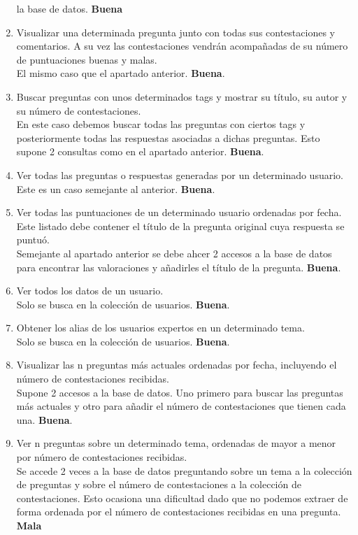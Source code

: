 \documentclass{article}
\begin{document}
\begin{enumerate}
      la base de datos. \textbf{Buena}
      \item Visualizar una determinada pregunta junto con todas sus contestaciones
      y comentarios. A su vez las contestaciones vendrán acompañadas de su
      número de puntuaciones buenas y malas. \\
      El mismo caso que el apartado anterior. \textbf{Buena}.
      \item Buscar preguntas con unos determinados tags y mostrar su título, su autor
      y su número de contestaciones. \\
      En este caso debemos buscar todas las preguntas con ciertos tags y posteriormente
      todas las respuestas asociadas a dichas preguntas. Esto supone 2 consultas como 
      en el apartado anterior. \textbf{Buena}.
      \item Ver todas las preguntas o respuestas generadas por un determinado usuario. \\
      Este es un caso semejante al anterior. \textbf{Buena}.
      \item Ver todas las puntuaciones de un determinado usuario ordenadas por fecha.
      Este listado debe contener el título de la pregunta original cuya respuesta
      se puntuó. \\
      Semejante al apartado anterior se debe ahcer 2 accesos a la base de datos para 
      encontrar las valoraciones y añadirles el título de la pregunta. \textbf{Buena}.
      \item Ver todos los datos de un usuario.\\
      Solo se busca en la colección de usuarios. \textbf{Buena}.
      \item Obtener los alias de los usuarios expertos en un determinado tema.\\
      Solo se busca en la colección de usuarios. \textbf{Buena}.
      \item Visualizar las n preguntas más actuales ordenadas por fecha, incluyendo
      el número de contestaciones recibidas.\\
      Supone 2 accesos a la base de datos. Uno primero para buscar las preguntas más actuales
      y otro para añadir el número de contestaciones que tienen cada una. \textbf{Buena}.
      \item Ver n preguntas sobre un determinado tema, ordenadas de mayor a menor
      por número de contestaciones recibidas.\\
      Se accede 2 veces a la base de datos preguntando sobre un tema a la colección de
      preguntas y sobre el número de contestaciones a la colección de contestaciones. Esto 
      ocasiona una dificultad dado que no podemos extraer de forma ordenada por el número de
      contestaciones recibidas en una pregunta. \textbf{Mala}
    \end{enumerate}

    
\end{document}
